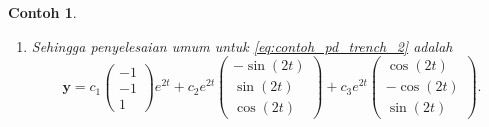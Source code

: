 \documentclass[a4paper]{article}
\theoremstyle{definisi}
\newtheorem{contoh}{Contoh}[section]
\numberwithin{equation}{section}
\begin{document}
\begin{contoh}
\begin{enumerate}[label=Langkah \arabic*: ,leftmargin=*]
\begin{align*}
      \end{align*}
      dan
      \begin{align*}
        \mathbf{y}_3(t) &= e^{2t}\left(\begin{pmatrix}0\\0\\1\end{pmatrix}\sin(2t) + \begin{pmatrix}1\\-1\\0\end{pmatrix}\cos(2t)\right)=\begin{pmatrix}\cos(2t)\\-\cos(2t)\\\sin(2t)\end{pmatrix}
      \end{align*}
      \item Sehingga penyelesaian umum untuk \eqref{eq:contoh_pd_trench_2} adalah
      \[\mathbf{y}=c_1\begin{pmatrix}-1\\-1\\1\end{pmatrix}e^{2t} + c_2e^{2t}\begin{pmatrix}-\sin(2t)\\\sin(2t)\\\cos(2t)\end{pmatrix} + c_3e^{2t}\begin{pmatrix}\cos(2t)\\-\cos(2t)\\\sin(2t)\end{pmatrix}.\]
    \end{enumerate}
  \end{contoh}
\end{document}
